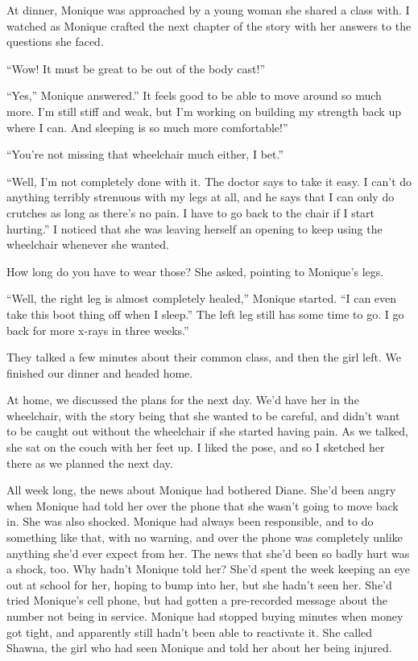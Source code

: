 At dinner, Monique was approached by a young woman she shared a class with. I watched as
Monique crafted the next chapter of the story with her answers to the questions she faced.

``Wow! It must be great to be out of the body cast!''

``Yes,'' Monique answered.'' It feels good to be able to move around so much more. I'm still
stiff and weak, but I'm working on building my strength back up where I can. And sleeping is so
much more comfortable!''

``You're not missing that wheelchair much either, I bet.''

``Well, I'm not completely done with it. The doctor says to take it easy. I can't do
anything terribly strenuous with my legs at all, and he says that I can only do crutches as long
as there's no pain. I have to go back to the chair if I start hurting.'' I noticed that she was
leaving herself an opening to keep using the wheelchair whenever she wanted.

How long do you have to wear those? She asked, pointing to Monique's legs.

``Well, the right leg is almost completely healed,'' Monique started. ``I can even take this
boot thing off when I sleep.'' The left leg still has some time to go. I go back for more x-rays
in three weeks.''

They talked a few minutes about their common class, and then the girl left. We finished our
dinner and headed home.

At home, we discussed the plans for the next day. We'd have her in the wheelchair, with the
story being that she wanted to be careful, and didn't want to be caught out without the
wheelchair if she started having pain. As we talked, she sat on the couch with her feet up. I
liked the pose, and so I sketched her there as we planned the next day.

All week long, the news about Monique had bothered Diane. She'd been angry when Monique had
told her over the phone that she wasn't going to move back in. She was also shocked. Monique had
always been responsible, and to do something like that, with no warning, and over the phone was
completely unlike anything she'd ever expect from her. The news that she'd been so badly hurt
was a shock, too. Why hadn't Monique told her? She'd spent the week keeping an eye out at school
for her, hoping to bump into her, but she hadn't seen her. She'd tried Monique's cell phone, but
had gotten a pre-recorded message about the number not being in service. Monique had stopped
buying minutes when money got tight, and apparently still hadn't been able to reactivate it. She
called Shawna, the girl who had seen Monique and told her about her being injured.

